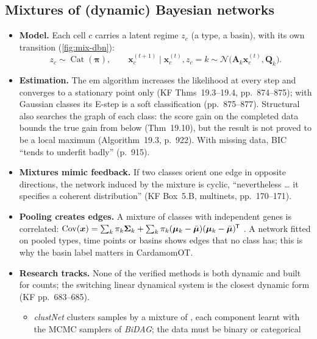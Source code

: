 \documentclass[11pt,a4paper]{article}
\begin{document}
\subsection{Mixtures of (dynamic) Bayesian networks}\label{app:bn-mixture}

\begin{itemize}
  \item \textbf{Model.} Each cell $c$ carries a latent regime $z_c$ (a type, a basin), with its own transition
        (\cref{fig:mix-dbn}):
        \begin{equation}\label{eq:mix-dbn}
        z_c\sim\operatorname{Cat}(\bm\pi),\qquad
        \bm x^{(t+1)}_c\mid\bm x^{(t)}_c,z_c=k\sim\mathcal N\bigl(\bm A_k\bm x^{(t)}_c,\bm Q_k\bigr).
        \end{equation}
  \item \textbf{Estimation.} The \gls{em} algorithm increases the likelihood at every step and converges to a
        stationary point only (KF Thms~19.3--19.4, pp.~874--875); with Gaussian classes its E-step is a soft
        classification (pp.~875--877). Structural  also searches the graph of each class: the
        score gain on the completed data bounds the true gain from below (Thm~19.10), but the result is not proved
        to be a local maximum (Algorithm~19.3, p.~922). With missing data, BIC \enquote{tends to underfit badly}
        (p.~915).
  \item \textbf{Mixtures mimic feedback.} If two classes orient one edge in opposite directions, the network
        induced by the mixture is cyclic, \enquote{nevertheless … it specifies a coherent distribution} (KF Box~5.B,
        multinets, pp.~170--171).
  \item \textbf{Pooling creates edges.} A mixture of classes with independent genes is correlated:
        $\operatorname{Cov}(\bm x)=\sum_k\pi_k\bm{\Sigma}_k+\sum_k\pi_k(\bm{\mu}_k-\bar{\bm{\mu}})(\bm{\mu}_k-\bar{\bm{\mu}})^{\mkern-1.5mu\mathsf{T}}$ . A network fitted
        on pooled types, time points or basins shows edges that no class has; this is why the basin label matters
        in CardamomOT.
  \item \textbf{Research tracks.} None of the verified methods is both dynamic and built for counts; the switching linear
        dynamical system is the closest dynamic form (KF pp.~683--685).
        \begin{itemize}
          \item \emph{clustNet} clusters samples by a mixture of , each component learnt with the
                MCMC samplers of \emph{BiDAG}; the data must be binary or categorical

\end{itemize}
\end{itemize}
\end{document}
